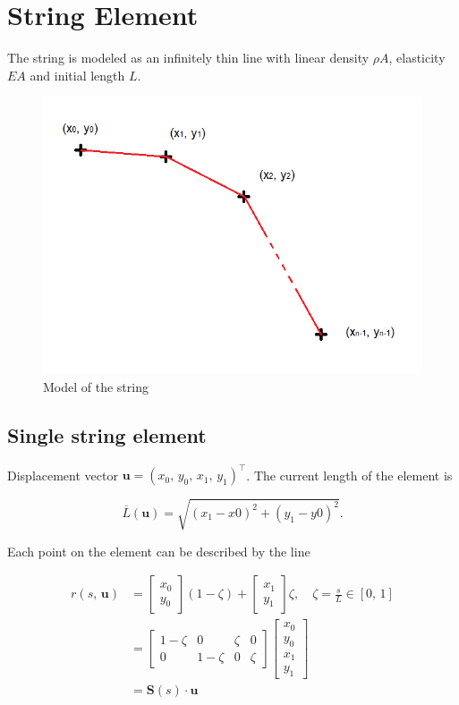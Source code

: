 \newpage
\section{String Element}

The string is modeled as an infinitely thin line with linear density $\rho A$, elasticity $EA$ and initial length $L$.

\begin{figure}[h]
\centering
\includegraphics[width=0.6\linewidth]{figures/elements/string-element.png}
\caption{Model of the string}
\label{fig:elements:string-element-old}
\end{figure}

\subsection{Single string element}

Displacement vector $\boldsymbol{u} = (x_0,\,y_0,\,x_1,\,y_1)^\intercal$. The current length of the element is

$$
\overline{L}(\boldsymbol{u}) = \sqrt{(x_{1} - x{0})^2 + (y_{1} - y{0})^2}.
$$

Each point on the element can be described by the line

\begin{align*}
r(s,\,\boldsymbol{u}) &= \begin{bmatrix} x_0 \\ y_0 \end{bmatrix}(1 - \zeta) + \begin{bmatrix} x_1 \\ y_1 \end{bmatrix} \zeta, \quad \zeta = \frac{s}{L} \in [0,\,1] \\
&=
\begin{bmatrix}
1 - \zeta & 0 & \zeta & 0 \\
0 & 1 - \zeta & 0 & \zeta
\end{bmatrix}
\begin{bmatrix}
x_0 \\ y_0 \\ x_1 \\ y_1
\end{bmatrix}
\\
&= \boldsymbol{S}(s) \cdot \boldsymbol{u}
\end{align*}

